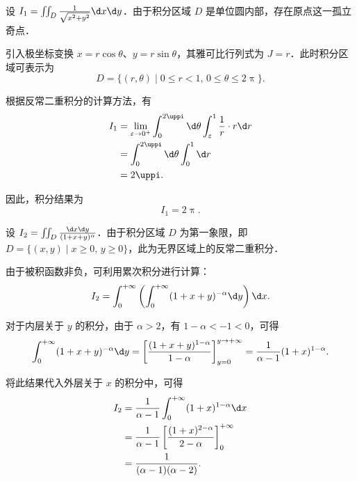 \begin{solution}

    设 $I_1 = \iint_D \frac{1}{\sqrt{x^2 + y^2}} \d x \d y$．由于积分区域 $D$ 是单位圆内部，存在原点这一孤立奇点．

    引入极坐标变换 $x = r \cos \theta$、$y = r \sin \theta$，其雅可比行列式为 $J = r$．此时积分区域可表示为
    \begin{equation}
        D = \{ (r, \theta) \mid 0 \leqslant r < 1,\, 0 \leqslant \theta \leqslant 2\uppi \}.
    \end{equation}

    根据反常二重积分的计算方法，有
    \begin{equation}
        \begin{aligned}
            I_1 & = \lim_{\varepsilon \to 0^+} \int_0^{2\uppi} \d \theta \int_{\varepsilon}^1 \frac{1}{r} \cdot r \d r \\
                & = \int_0^{2\uppi} \d \theta \int_0^1 \d r                                                            \\
                & = 2\uppi.
        \end{aligned}
    \end{equation}

    因此，积分结果为
    \begin{equation}
        I_1 = \boxed{2\uppi}.
    \end{equation}


    设 $I_2 = \iint_D \frac{\d x \d y}{(1 + x + y)^\alpha}$．由于积分区域 $D$ 为第一象限，即 $D = \{ (x, y) \mid x \geqslant 0,\, y \geqslant 0 \}$，此为无界区域上的反常二重积分．

    由于被积函数非负，可利用累次积分进行计算：
    \begin{equation}
        I_2 = \int_0^{+\infty} \left( \int_0^{+\infty} (1 + x + y)^{-\alpha} \d y \right) \d x.
    \end{equation}

    对于内层关于 $y$ 的积分，由于 $\alpha > 2$，有 $1 - \alpha < -1 < 0$，可得
    \begin{equation}
        \int_0^{+\infty} (1 + x + y)^{-\alpha} \d y = \left[ \frac{(1 + x + y)^{1-\alpha}}{1 - \alpha} \right]_{y=0}^{y\to+\infty} = \frac{1}{\alpha - 1} (1 + x)^{1-\alpha}.
    \end{equation}

    将此结果代入外层关于 $x$ 的积分中，可得
    \begin{equation}
        \begin{aligned}
            I_2 & = \frac{1}{\alpha - 1} \int_0^{+\infty} (1 + x)^{1-\alpha} \d x                         \\
                & = \frac{1}{\alpha - 1} \left[ \frac{(1 + x)^{2-\alpha}}{2 - \alpha} \right]_0^{+\infty} \\
                & = \frac{1}{(\alpha - 1)(\alpha - 2)}.
        \end{aligned}
    \end{equation}


\end{solution}
